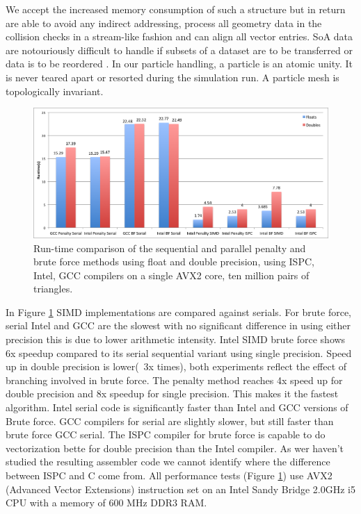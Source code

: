 \documentclass[times,12pt]{article}
\begin{document}
We accept the increased memory consumption of such a structure but in return are
able to avoid any indirect addressing, process all geometry data in the
collision checks in a stream-like fashion and can align all vector entries. 
SoA data are notouriously difficult to handle if subsets of a dataset are to be
transferred or data is to be reordered \cite{Eichenberger2004}.
In our particle handling, a particle is an atomic unity.
It is never teared apart or resorted during the simulation run.
A particle mesh is topologically invariant.


\begin{figure}[!h]
\centering
\includegraphics[width=1\textwidth]{perf} \protect\caption{\label{fig17}Run-time comparison of the sequential and parallel penalty and brute force methods using float and double precision, using ISPC, Intel, GCC compilers on a single AVX2 core, ten million pairs of triangles.}
\end{figure} 

In Figure \ref{fig17} SIMD implementations are compared against serials. For brute force, serial Intel and GCC are the slowest with no significant difference in using either precision this is due to lower arithmetic intensity. Intel SIMD  brute force shows 6x speedup compared to its serial sequential variant using single precision. Speed up in double precision is lower(~3x times), both experiments reflect the effect of branching involved in brute force. 
The penalty method reaches 4x speed up for double precision and 8x speedup for single precision. This makes it the fastest algorithm. Intel serial code is significantly faster than Intel and GCC versions of Brute force. GCC compilers for serial are slightly slower, but still faster than brute force GCC serial. The ISPC compiler for brute force is capable to do vectorization bette for double precision than the Intel compiler. As wer haven't studied the resulting assembler code we cannot identify where the difference between ISPC and C come from. All performance tests (Figure \ref{fig17}) use AVX2 (Advanced Vector Extensions) instruction set on an Intel Sandy Bridge 2.0GHz i5 CPU with a memory of 600 MHz DDR3 RAM.
\end{document}
